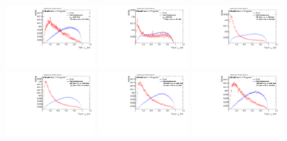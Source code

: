 \begin{figure}[H]
\includegraphics[width=0.3\textwidth]{sascha_input/Appendix/Distributions/top/distributions/beta2/h_assisted_tj_nSub32_2_bin6.pdf} 
\bigskip
\includegraphics[width=0.3\textwidth]{sascha_input/Appendix/Distributions/top/distributions/beta2/h_normal_tj_nSub32_2_bin1.pdf} \hspace{1mm}
\includegraphics[width=0.3\textwidth]{sascha_input/Appendix/Distributions/top/distributions/beta2/h_normal_tj_nSub32_2_bin2.pdf} \hspace{1mm}
\includegraphics[width=0.3\textwidth]{sascha_input/Appendix/Distributions/top/distributions/beta2/h_normal_tj_nSub32_2_bin3.pdf} 
\bigskip
\includegraphics[width=0.3\textwidth]{sascha_input/Appendix/Distributions/top/distributions/beta2/h_normal_tj_nSub32_2_bin4.pdf} \hspace{1mm}
\includegraphics[width=0.3\textwidth]{sascha_input/Appendix/Distributions/top/distributions/beta2/h_normal_tj_nSub32_2_bin5.pdf} \hspace{1mm}

\end{figure}
